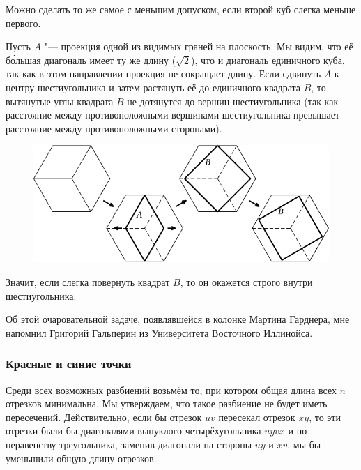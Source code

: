\documentclass[twoside]{book}
\begin{document}
Можно сделать то же самое с меньшим допуском, если второй куб слегка меньше первого.


Пусть $A$ "--- проекция одной из видимых граней на плоскость.
Мы видим, что её б\'{о}льшая диагональ имеет ту же длину ($\sqrt{2}$), что и диагональ единичного куба, так как в этом направлении проекция не сокращает длину.
Если сдвинуть  $A$ к центру шестиугольника и затем растянуть её до единичного квадрата $B$, то вытянутые углы квадрата $B$ не дотянутся до вершин шестиугольника (так как расстояние между противоположными вершинами шестиугольника превышает расстояние между противоположными сторонами).

\begin{figure}[!ht]
\centering
\includegraphics{mp/wink-11}
\end{figure}

Значит, если слегка повернуть квадрат $B$, то он окажется строго внутри шестиугольника.\heart

Об этой очаровательной задаче, появлявшейся в колонке Мартина Гарднера, мне напомнил Григорий Гальперин из Университета Восточного Иллинойса.

\subsubsection*{Красные и синие точки}%

Среди всех возможных разбиений возьмём то, при котором общая длина всех $n$ отрезков минимальна.
Мы утверждаем, что такое разбиение не будет иметь пересечений.
Действительно, если бы отрезок $uv$ пересекал отрезок $xy$, то эти отрезки были бы диагоналями выпуклого четырёхугольника $uyvx$ %
и по неравенству треугольника, заменив диагонали на стороны $uy$ и $xv$, мы бы уменьшили общую длину отрезков.
\heart
\end{document}
